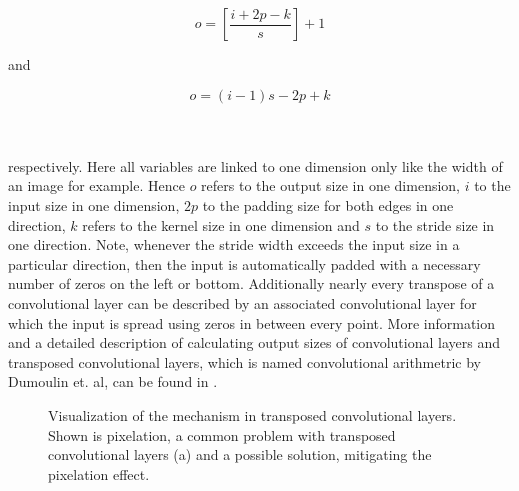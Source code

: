 \noindent\begin{minipage}{.45\textwidth}
	\begin{equation}
		o = \left[\frac{i+2p-k}{s}\right]+1  
	\end{equation}
\end{minipage} \hfill and %
\begin{minipage}{.45\textwidth}
	\begin{equation}
		o = (i-1)s - 2p + k
	\end{equation}\label{Eq:transconv}
\end{minipage}\\\\
respectively. Here all variables are linked to one dimension only like the width of an image for example. Hence $o$ refers to the output size in one dimension, $i$ to the input size in one dimension, $2p$ to the padding size for both edges in one direction, $k$ refers to the kernel size in one dimension and $s$ to the stride size in one direction. Note, whenever the stride width exceeds the input size in a particular direction, then the input is automatically padded with a necessary number of zeros on the left or bottom. Additionally nearly every transpose of a convolutional layer can be described by an associated convolutional layer for which the input is spread using zeros in between every point. More information and a detailed description of calculating output sizes of convolutional layers and transposed convolutional layers, which is named convolutional arithmetric by Dumoulin et. al, can be found in \cite{dumoulin2018guide}.  
\begin{figure}[htbp!]
	\begin{subfigure}{.435\textwidth}
		\centering
		
		\label{Fig: Upsampling(a)}
	\end{subfigure}\hfill
	\begin{subfigure}{.455\textwidth}
		\centering
		
		\label{Fig: Upsampling(b)}
	\end{subfigure}
	\caption{Visualization of the mechanism in transposed convolutional layers. Shown is pixelation, a common problem with transposed convolutional layers (a) and a possible solution, mitigating the pixelation effect.}
	\label{Fig: Upsampling}
\end{figure}\\
